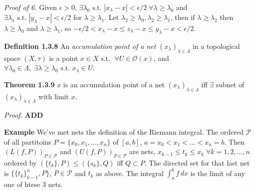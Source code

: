 \documentclass[12pt]{article}
\newcommand{\st}[0]{ \textrm{ s.t. } }
\newcommand{\eps}[0] {  \epsilon }
\newcommand{\lam}[0] {  \lambda }
\newcommand{\Lam}[0] {  \Lambda }
\newcommand{\curlyO}[0] { \mathcal{O} }
\newcommand{\curlyP}[0] { \mathcal{P} }
\begin{document}
\begin{flushleft} \emph{ Proof of 6. }
Given $\eps > 0$, $\exists \lambda_0 \st |x_\lambda - x| < \eps / 2 \; \forall \lambda \ge \lambda_0$ and $\exists \lambda_1 \st |y_\lambda - x| < \eps / 2$ for $\lambda \ge \lambda_1$. 
Let $\lambda_2 \ge \lambda_0, \lambda_2 \ge \lambda_1$, 
then if $\lambda \ge \lambda_2$ then  $\lambda \ge \lambda_0$ and $\lambda \ge \lambda_1$,
 so $-\eps / 2 < x_\lambda - x \le z_\lambda - x \le y_\lambda - x < \eps / 2 $.
\end{flushleft}






\begin{flushleft} {\bf Definition 1.3.8} An \emph{accumulation point of a net} $(x_\lambda)_{\lambda \in \Lambda}$ in a topological space $(X, \tau)$ is a point $x \in X \st \; \forall U \in \curlyO(x)$, and $\forall \lambda_0 \in \Lambda, \; \exists \lambda \ge \lambda_0 \st x_\lambda \in U$.
\end{flushleft}


\begin{flushleft} {\bf Theorem 1.3.9} $x$ is an accumulation point of a net $(x_\lam)_{\lam \in \Lam}$ iff $\exists$ subnet of $(x_\lambda)_{\lambda \in \Lambda}$ with limit $x$.
\end{flushleft}

\begin{flushleft} \emph{Proof. } { \bf ADD }
\end{flushleft}


\begin{flushleft} {\bf Example }
We've met nets the definition of the Riemann integral. The ordered $\curlyP$ of all partitoins $P = \{ x_0, x_1, ..., x_n \}$ of $[a,b]$, $a = x_0 < x_1 < ... < x_n = b$. Then $(L(f, P))_{P \in \curlyP}$ and $(U(f,P))_{P \in \curlyP}$ are nets, $x_{k-1} \le t_k \le x_k \; \forall k=1,2,..., n$ ordered by $(\{ t_k \} , P ) \le ( \{ s_k \}, Q)$ iff $Q \subset P$. The directed set for that last net is $\{ \{ t_k \} _{k-1}^n, P \}$, $P \in \curlyP$ and $t_k$ as above. The integral $\int_a^b f \, dx$ is the limit of any one of htese 3 nets. 
\end{flushleft}
\end{document}
